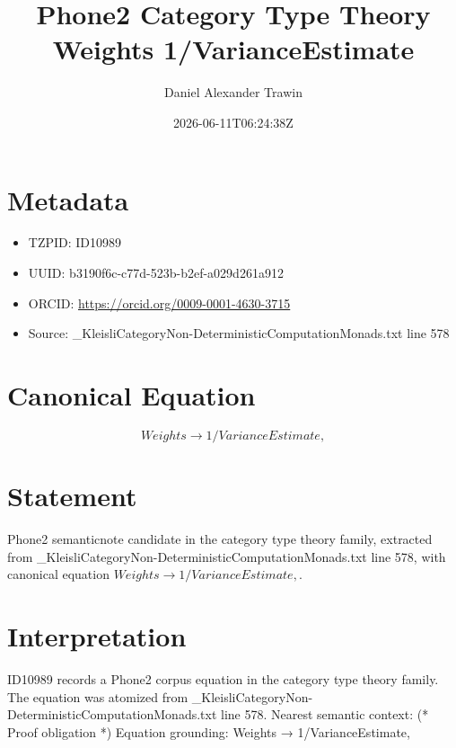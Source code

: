 \documentclass[11pt]{article}
\title{Phone2 Category Type Theory Weights 1/VarianceEstimate}
\author{Daniel Alexander Trawin}
\date{2026-06-11T06:24:38Z}
\begin{document}
\maketitle
\section*{Metadata}
\begin{itemize}
\item TZPID: ID10989
\item UUID: b3190f6c-c77d-523b-b2ef-a029d261a912
\item ORCID: \url{https://orcid.org/0009-0001-4630-3715}
\item Source: _KleisliCategoryNon-DeterministicComputationMonads.txt line 578
\end{itemize}
\section*{Canonical Equation}
\[
Weights → 1/VarianceEstimate,
\]
\section*{Statement}
Phone2 semanticnote candidate in the category type theory family, extracted from _KleisliCategoryNon-DeterministicComputationMonads.txt line 578, with canonical equation $Weights → 1/VarianceEstimate,$.
\section*{Interpretation}
ID10989 records a Phone2 corpus equation in the category type theory family. The equation was atomized from _KleisliCategoryNon-DeterministicComputationMonads.txt line 578. Nearest semantic context: (* Proof obligation *) Equation grounding: Weights → 1/VarianceEstimate,
\end{document}
